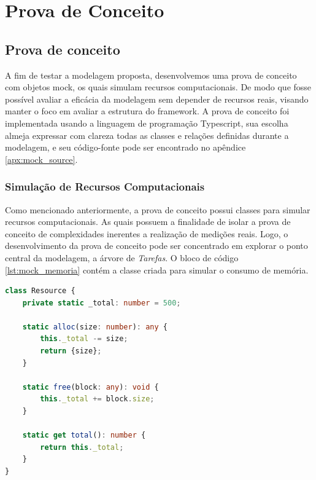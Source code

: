 \documentclass[12pt]{tcc}
\begin{document}
\label{bibpage}
\renewcommand\bibname{Referências}

%

\label{bibfinalpage}

\label{lastpage}



\appendix
\chapter{Prova de Conceito}
\label{apx:mock}

\section{Prova de conceito}
\label{cap:prova_de_conceito}

A fim de testar a modelagem proposta, desenvolvemos uma prova de conceito com objetos mock, os quais simulam recursos computacionais.
De modo que fosse possível avaliar a eficácia da modelagem sem depender de recursos reais, visando manter o foco em avaliar a estrutura do framework.
A prova de conceito foi implementada usando a linguagem de programação Typescript, sua escolha almeja expressar com clareza todas as classes e relações definidas durante a modelagem, e seu código-fonte pode ser encontrado no apêndice \ref{apx:mock_source}.


\subsection{Simulação de Recursos Computacionais}
Como mencionado anteriormente, a prova de conceito possui classes para simular recursos computacionais.
As quais possuem a finalidade de isolar a prova de conceito de complexidades inerentes a realização de medições reais.
Logo, o desenvolvimento da prova de conceito pode ser concentrado em explorar o ponto central da modelagem, a árvore de \emph{Tarefas}.
O bloco de código \ref{lst:mock_memoria} contém a classe criada para simular o consumo de memória.

\begin{lstlisting}[label={lst:mock_memoria}, caption={Implementação da classe responsável por simular recursos de memória para a prova de conceito do framework.}, language=TypeScript]
class Resource {
	private static _total: number = 500;

	static alloc(size: number): any {
		this._total -= size;
		return {size};
	}

	static free(block: any): void {
		this._total += block.size;
	}

	static get total(): number {
		return this._total;
	}
}
\end{lstlisting}
\end{document}
